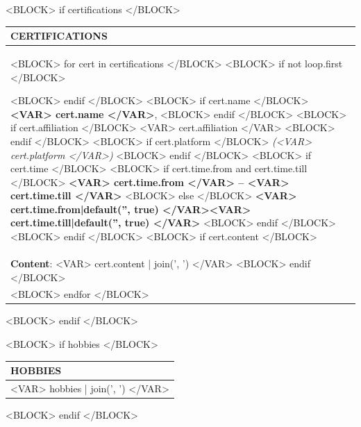 \documentclass[<VAR> meta.fontsize|default('10pt', true) </VAR>]{extarticle}                %
\begin{document}
<BLOCK> if certifications </BLOCK>
\begin{tabularx}{\textwidth}{>{\raggedright\arraybackslash}X}

    \large\textbf{CERTIFICATIONS} \\
    \toprule[1pt]

    <BLOCK> for cert in certifications </BLOCK>
        <BLOCK> if not loop.first </BLOCK>

        \toprule[0.5pt]
        <BLOCK> endif </BLOCK>
        <BLOCK> if cert.name </BLOCK>
        \textbf{<VAR> cert.name </VAR>}, 
        <BLOCK> endif </BLOCK>
        <BLOCK> if cert.affiliation </BLOCK>
        <VAR> cert.affiliation </VAR> 
        <BLOCK> endif </BLOCK>
        <BLOCK> if cert.platform </BLOCK>
        \textit{(<VAR> cert.platform </VAR>)} 
        <BLOCK> endif </BLOCK>
        <BLOCK> if cert.time </BLOCK>
        <BLOCK> if cert.time.from and cert.time.till </BLOCK>
        \hfill \textbf{<VAR> cert.time.from </VAR> – <VAR> cert.time.till </VAR>}
        <BLOCK> else </BLOCK>
        \hfill \textbf{<VAR> cert.time.from|default('', true) </VAR><VAR> cert.time.till|default('', true) </VAR>}
        <BLOCK> endif </BLOCK>
        <BLOCK> endif </BLOCK>
        <BLOCK> if cert.content </BLOCK>
        \\
        \textbf{Content}: 
        <VAR> cert.content | join(', ') </VAR>
        <BLOCK> endif </BLOCK>
        \\
    <BLOCK> endfor </BLOCK>

\end{tabularx}
<BLOCK> endif </BLOCK>

<BLOCK> if hobbies </BLOCK>
\begin{tabularx}{\textwidth}{>{\raggedright\arraybackslash}X}

    \large\textbf{HOBBIES} \\
    \toprule[1pt]

        <VAR> hobbies | join(', ') </VAR> \\

\end{tabularx}
<BLOCK> endif </BLOCK>
\end{document}
